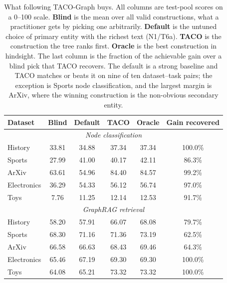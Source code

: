 \begin{table}[htbp]
\centering
\small
\caption{What following TACO-Graph buys. All columns are test-pool scores on a
0--100 scale. \textbf{Blind} is the mean over all valid constructions, what a
practitioner gets by picking one arbitrarily. \textbf{Default} is the untuned
choice of primary entity with the richest text (N1/T6a). \textbf{TACO} is the
construction the tree ranks first. \textbf{Oracle} is the best construction in
hindsight. The last column is the fraction of the achievable gain over a blind
pick that TACO recovers. The default is a strong baseline and TACO matches or
beats it on nine of ten dataset--task pairs; the exception is Sports node
classification, and the largest margin is ArXiv, where the winning construction
is the non-obvious secondary entity.}
\label{tab:payoff}
\vspace{4pt}
\begin{tabular}{lccccc}
\toprule
Dataset & Blind & Default & TACO & Oracle & Gain recovered \\
\midrule
\multicolumn{6}{c}{\textit{Node classification}} \\
\midrule
History & 33.81 & 34.88 & 37.34 & 37.34 & 100.0\% \\
Sports & 27.99 & 41.00 & 40.17 & 42.11 & 86.3\% \\
ArXiv & 63.61 & 54.96 & 84.40 & 84.57 & 99.2\% \\
Electronics & 36.29 & 54.33 & 56.12 & 56.74 & 97.0\% \\
Toys & 7.76 & 11.25 & 12.14 & 12.53 & 91.7\% \\
\midrule
\multicolumn{6}{c}{\textit{GraphRAG retrieval}} \\
\midrule
History & 58.20 & 57.91 & 66.07 & 68.08 & 79.7\% \\
Sports & 68.30 & 71.16 & 71.36 & 73.19 & 62.5\% \\
ArXiv & 66.58 & 66.63 & 68.43 & 69.46 & 64.3\% \\
Electronics & 65.46 & 67.19 & 69.30 & 69.30 & 100.0\% \\
Toys & 64.08 & 65.21 & 73.32 & 73.32 & 100.0\% \\
\bottomrule
\end{tabular}
\end{table}
